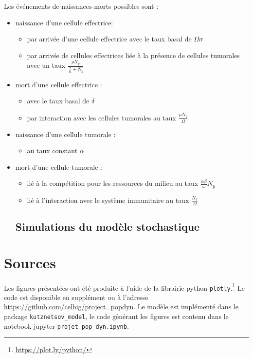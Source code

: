 \documentclass[12pt]{article}
\begin{document}
Les \'ev\'enements de naissances-morts possibles sont :
\begin{itemize}
\item naissance d'une cellule effectrice:
    \begin{itemize}
        \item par arriv\'ee d'une cellule effectrice avec le taux basal de $\Omega \sigma$
        \item par arriv\'ee de cellules effectrices li\'ee \`a la pr\'esence de cellules tumorales avec un taux $\frac{\rho N_y}{\frac{\eta}{\Omega} + N_y }$
    \end{itemize}
\item mort d'une cellule effectrice :
\begin{itemize}
    \item avec le taux basal de $\delta$
    \item par interaction avec les cellules tumorales au taux $\frac{\mu N_y}{\Omega}$
\end{itemize}
\item naissance d'une cellule tumorale :
\begin{itemize}
    \item au taux constant $\alpha$
\end{itemize}
\item mort d'une cellule tumorale :
\begin{itemize}
    \item li\'e \`a la compétition pour les ressources du milieu au taux $\frac{\alpha \beta}{\omega}N_y$
    \item li\'e \`a l'interaction avec le syst\`eme immunitaire au taux $\frac{N_x}{\Omega}$
\end{itemize}

\subsection{Simulations du mod\`ele stochastique}
\end{itemize}
\section*{Sources}
Les figures présentées ont été produite  à l'aide de la librairie python \texttt{plotly}.\footnote{\url{https://plot.ly/python/}} Le code est disponible en supplément ou à l'adresse \url{https://github.com/celbig/project_popdyn}. Le modèle est implémenté dans le package \texttt{kutznetsov\_model}, le code générant les figures est contenu dans le notebook jupyter \texttt{projet\_pop\_dyn.ipynb}.

\clearpage


\end{document}
